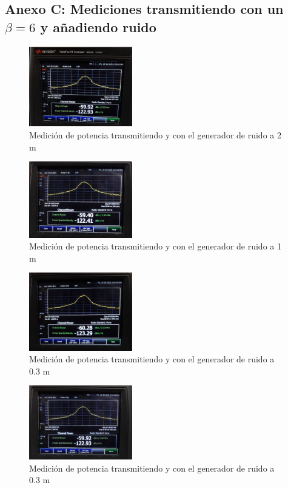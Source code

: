 \documentclass[conference]{IEEEtran}
\begin{document}
	
	\subsection{Anexo C: Mediciones transmitiendo con un $\beta =6$ y añadiendo ruido}
	
	\begin{figure}[h]
		\centering
		\includegraphics[width=0.4\textwidth]{media/M-S6+R2.jpg}
		\caption{Medición de potencia transmitiendo y con el generador de ruido a 2 m}
		\label{fig:M-S6+R2}
	\end{figure}
	
	\begin{figure}[h]
		\centering
		\includegraphics[width=0.4\textwidth]{media/M-S6+R1.jpg}
		\caption{Medición de potencia transmitiendo y con el generador de ruido a 1 m}
		\label{fig:M-S6+R1}
	\end{figure}
	
	\begin{figure}[h]
		\centering
		\includegraphics[width=0.4\textwidth]{media/M-S6+R0.5.jpg}
		\caption{Medición de potencia transmitiendo y con el generador de ruido a 0.3 m}
		\label{fig:M-S6+R.5}
	\end{figure}
	
	\begin{figure}[h]
		\centering
		\includegraphics[width=0.4\textwidth]{media/M-S6+R0.3.jpg}
		\caption{Medición de potencia transmitiendo y con el generador de ruido a 0.3 m}
		\label{fig:M-S6+R0.3}
	\end{figure}
\end{document}
